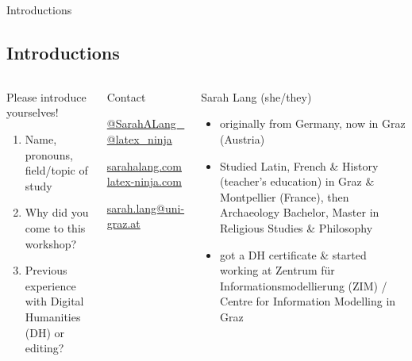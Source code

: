 \documentclass[10pt]{beamer}
\begin{document}
\begin{frame}{Introductions}
\subsection{Introductions}
  \begin{columns}[T,onlytextwidth]
      \begin{alertblock}{Please introduce yourselves!}
      \footnotesize
        \begin{enumerate}
            \item Name, pronouns, field/topic of study
            \item Why did you come to this workshop?
            \item Previous experience with Digital Humanities (DH) or editing?
        \end{enumerate}
      \end{alertblock}

 { 
      \begin{block}{Contact} 
      \begin{description}\scriptsize 
        \item[\faTwitter] \href{https://twitter.com/SarahALang_}{@SarahALang\_} \\ \href{https://twitter.com/latex_ninja}{@latex\_ninja}
        \item[\faHome] \protect\url{sarahalang.com} \\ \protect\url{latex-ninja.com}
        \item[\faAt] \protect\url{sarah.lang@uni-graz.at}
      \end{description}
      \end{block}
      }

      \begin{block}{Sarah Lang (she/they)}
      \scriptsize
      \begin{itemize}
          \item originally from Germany, now in Graz (Austria)
          \item Studied Latin, French \& History (teacher's education) in Graz \& Montpellier (France), then Archaeology Bachelor, Master in Religious Studies \& Philosophy
          \item got a DH certificate \& started working at Zentrum für Informationsmodellierung (ZIM) / Centre for Information Modelling in Graz
          

\end{itemize}
\end{block}
\end{columns}
\end{frame}
\end{document}
